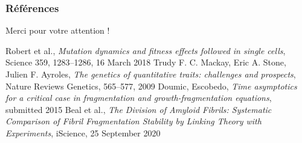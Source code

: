 \documentclass{beamer}
\begin{document}
\begin{frame}
  \frametitle{Références}

  \begin{center}
    \Large{Merci pour votre attention !}
  \end{center}
  
\begin{thebibliography}{1}

  Robert et al.,
  \emph{Mutation dynamics and fitness effects followed in single cells}, Science 359, 1283–1286, 16 March 2018
  Trudy F. C. Mackay, Eric A. Stone, Julien F. Ayroles,
  \emph{The genetics of quantitative traits: challenges and prospects}, Nature Reviews Genetics, 565–577, 2009
  Doumic, Escobedo,
  \emph{Time asymptotics for a critical case in fragmentation and growth-fragmentation equations}, submitted 2015
  Beal et al.,
  \emph{The Division of Amyloid Fibrils: Systematic Comparison of Fibril Fragmentation Stability by Linking Theory with Experiments}, iScience, 25 September 2020
\end{thebibliography}


\end{frame}
\end{document}
